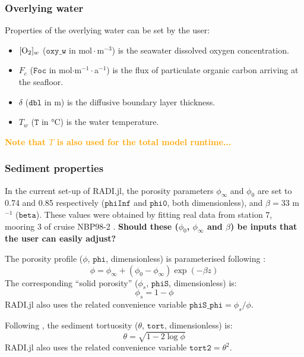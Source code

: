\documentclass[a4paper]{article}
\newcommand{\code}[1]{\texttt{#1}}
\newcommand{\molmmm}{\mathrm{mol}\cdot\mathrm{m}^{-3}}
\newcommand{\degC}{\si{\degree}\mathrm{C}}
\newcommand{\wtf}[1]{\textcolor{Cerulean}{\textbf{#1}}}
\newcommand{\codenote}[1]{\textcolor{Orange}{\textbf{#1}}}
\begin{document}
\subsubsection{Overlying water}

Properties of the overlying water can be set by the user:

\begin{itemize}
  \item $[\ce{O2}]_w$ ($\code{oxy\_w}$ in $\molmmm$) is the seawater dissolved oxygen concentration.
  \item $F_c$ ($\code{Foc}$ in mol$\cdot$m$^{-1}\cdot$a$^{-1}$) is the flux of particulate organic carbon arriving at the seafloor.
  \item $\delta$ ($\code{dbl}$ in m) is the diffusive boundary layer thickness.
  \item $T_w$ ($\code{T}$ in $\degC$) is the water temperature.
\end{itemize}
\codenote{Note that $T$ is also used for the total model runtime...}

\subsubsection{Sediment properties}

In the current set-up of RADI.jl, the porosity parameters $\phi_\infty$ and $\phi_0$ are set to 0.74 and 0.85 respectively ($\code{phiInf}$ and $\code{phi0}$, both dimensionless), and $\beta = 33$ m$^{-1}$ ($\code{beta}$). These values were obtained by fitting real data from station 7, mooring 3 of cruise NBP98-2 \citep{sayles_benthic_2001}. \wtf{Should these ($\phi_0$, $\phi_\infty$ and $\beta$) be inputs that the user can easily adjust?}

The porosity profile ($\phi$, $\code{phi}$, dimensionless) is parameterised following \citet{boudreau_method--lines_1996}:
\begin{equation}\label{phi}
\phi = \phi_\infty + (\phi_0 - \phi_\infty) \exp(-\beta z)
\end{equation}
The corresponding ``solid porosity'' ($\phi_s$, $\code{phiS}$, dimensionless) is:
\begin{equation}\label{phiS}
\phi_s = 1 - \phi
\end{equation}
RADI.jl also uses the related convenience variable $\code{phiS\_phi} = \phi_s/\phi$.

Following \citet{boudreau_diffusive_1996}, the sediment tortuosity ($\theta$, $\code{tort}$, dimensionless) is:
\begin{equation}\label{tort}
\theta = \sqrt{1 - 2 \log \phi}
\end{equation}
RADI.jl also uses the related convenience variable $\code{tort2} = \theta^2$.
\end{document}
